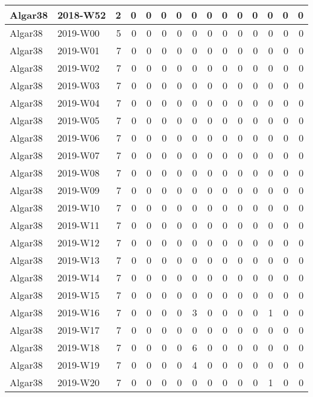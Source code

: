 \documentclass[]{book}
\begin{document}
\begin{table}
\begin{tabular}[t]{l|l|r|r|r|r|r|r|r|r|r|r|r|r|r}
\hline
Algar38 & 2018-W52 & 2 & 0 & 0 & 0 & 0 & 0 & 0 & 0 & 0 & 0 & 0 & 0 & 0\\
\hline
Algar38 & 2019-W00 & 5 & 0 & 0 & 0 & 0 & 0 & 0 & 0 & 0 & 0 & 0 & 0 & 0\\
\hline
Algar38 & 2019-W01 & 7 & 0 & 0 & 0 & 0 & 0 & 0 & 0 & 0 & 0 & 0 & 0 & 0\\
\hline
Algar38 & 2019-W02 & 7 & 0 & 0 & 0 & 0 & 0 & 0 & 0 & 0 & 0 & 0 & 0 & 0\\
\hline
Algar38 & 2019-W03 & 7 & 0 & 0 & 0 & 0 & 0 & 0 & 0 & 0 & 0 & 0 & 0 & 0\\
\hline
Algar38 & 2019-W04 & 7 & 0 & 0 & 0 & 0 & 0 & 0 & 0 & 0 & 0 & 0 & 0 & 0\\
\hline
Algar38 & 2019-W05 & 7 & 0 & 0 & 0 & 0 & 0 & 0 & 0 & 0 & 0 & 0 & 0 & 0\\
\hline
Algar38 & 2019-W06 & 7 & 0 & 0 & 0 & 0 & 0 & 0 & 0 & 0 & 0 & 0 & 0 & 0\\
\hline
Algar38 & 2019-W07 & 7 & 0 & 0 & 0 & 0 & 0 & 0 & 0 & 0 & 0 & 0 & 0 & 0\\
\hline
Algar38 & 2019-W08 & 7 & 0 & 0 & 0 & 0 & 0 & 0 & 0 & 0 & 0 & 0 & 0 & 0\\
\hline
Algar38 & 2019-W09 & 7 & 0 & 0 & 0 & 0 & 0 & 0 & 0 & 0 & 0 & 0 & 0 & 0\\
\hline
Algar38 & 2019-W10 & 7 & 0 & 0 & 0 & 0 & 0 & 0 & 0 & 0 & 0 & 0 & 0 & 0\\
\hline
Algar38 & 2019-W11 & 7 & 0 & 0 & 0 & 0 & 0 & 0 & 0 & 0 & 0 & 0 & 0 & 0\\
\hline
Algar38 & 2019-W12 & 7 & 0 & 0 & 0 & 0 & 0 & 0 & 0 & 0 & 0 & 0 & 0 & 0\\
\hline
Algar38 & 2019-W13 & 7 & 0 & 0 & 0 & 0 & 0 & 0 & 0 & 0 & 0 & 0 & 0 & 0\\
\hline
Algar38 & 2019-W14 & 7 & 0 & 0 & 0 & 0 & 0 & 0 & 0 & 0 & 0 & 0 & 0 & 0\\
\hline
Algar38 & 2019-W15 & 7 & 0 & 0 & 0 & 0 & 0 & 0 & 0 & 0 & 0 & 0 & 0 & 0\\
\hline
Algar38 & 2019-W16 & 7 & 0 & 0 & 0 & 0 & 3 & 0 & 0 & 0 & 0 & 1 & 0 & 0\\
\hline
Algar38 & 2019-W17 & 7 & 0 & 0 & 0 & 0 & 0 & 0 & 0 & 0 & 0 & 0 & 0 & 0\\
\hline
Algar38 & 2019-W18 & 7 & 0 & 0 & 0 & 0 & 6 & 0 & 0 & 0 & 0 & 0 & 0 & 0\\
\hline
Algar38 & 2019-W19 & 7 & 0 & 0 & 0 & 0 & 4 & 0 & 0 & 0 & 0 & 0 & 0 & 0\\
\hline
Algar38 & 2019-W20 & 7 & 0 & 0 & 0 & 0 & 0 & 0 & 0 & 0 & 0 & 1 & 0 & 0\\

\end{tabular}
\end{table}
\end{document}
